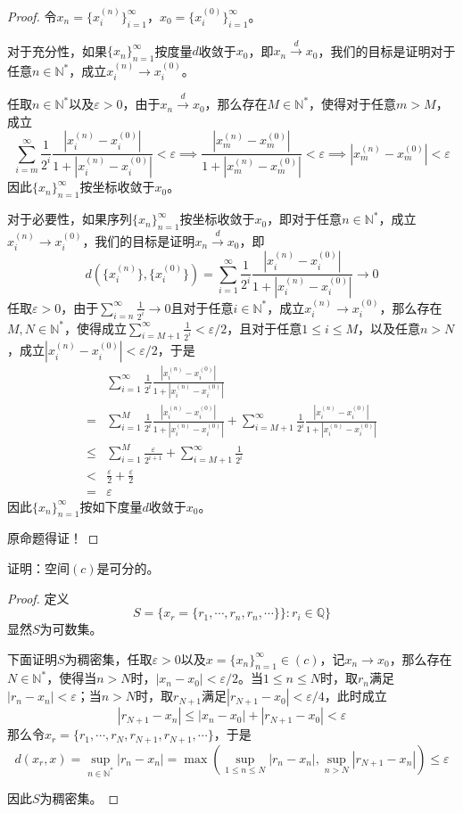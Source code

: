 \documentclass[lang = cn, scheme = chinese, 10pt]{elegantbook}
\newcommand{\N}{\mathbb{N}}  %
\newcommand{\Q}{\mathbb{Q}}  %
\begin{document}
\begin{proof}
	令$x_n=\{ x_i^{(n)} \}_{i=1}^{\infty}$，$x_0=\{ x_i^{(0)} \}_{i=1}^{\infty}$。
	
	对于充分性，如果$\{x_n\}_{n=1}^{\infty}$按度量$d$收敛于$x_0$，即$x_n\xrightarrow{d}x_0$，我们的目标是证明对于任意$n\in\N^*$，成立$x_i^{(n)}\to x_i^{(0)}$。
	
	任取$n\in\N^*$以及$\varepsilon>0$，由于$x_n\xrightarrow{d}x_0$，那么存在$M\in\N^*$，使得对于任意$m>M$，成立
	$$
	\sum_{i=m}^{\infty}\frac{1}{2^i}\frac{|x_i^{(n)}-x_i^{(0)}|}{1+|x_i^{(n)}-x_i^{(0)}|}<\varepsilon
	\implies 
	\frac{|x_m^{(n)}-x_m^{(0)}|}{1+|x_m^{(n)}-x_m^{(0)}|}<\varepsilon
	\implies
	|x_m^{(n)}-x_m^{(0)}|<\varepsilon
	$$
	因此$\{x_n\}_{n=1}^{\infty}$按坐标收敛于$x_0$。
	
	对于必要性，如果序列$\{x_n\}_{n=1}^{\infty}$按坐标收敛于$x_0$，即对于任意$n\in\N^*$，成立$x_i^{(n)}\to x_i^{(0)}$，我们的目标是证明$x_n\xrightarrow{d}x_0$，即
	$$
	d(\{x_i^{(n)}\},\{x_i^{(0)}\})=\sum_{i=1}^{\infty}\frac{1}{2^i}\frac{|x_i^{(n)}-x_i^{(0)}|}{1+|x_i^{(n)}-x_i^{(0)}|}\to0
	$$
	任取$\varepsilon>0$，由于$\displaystyle\sum_{i=n}^{\infty}\frac{1}{2^i}\to0$且对于任意$i\in\N^*$，成立$x_i^{(n)}\to x_i^{(0)}$，那么存在$M,N\in\N^*$，使得成立$\displaystyle\sum_{i=M+1}^{\infty}\frac{1}{2^i}<\varepsilon/2$，且对于任意$1\le i \le M$，以及任意$n>N$，成立$|x_i^{(n)}-x_i^{(0)}|<\varepsilon/2$，于是
	\nonumber\begin{align}
		&\sum_{i=1}^{\infty}\frac{1}{2^i}\frac{|x_i^{(n)}-x_i^{(0)}|}{1+|x_i^{(n)}-x_i^{(0)}|}\\
		= & \sum_{i=1}^{M}\frac{1}{2^i}\frac{|x_i^{(n)}-x_i^{(0)}|}{1+|x_i^{(n)}-x_i^{(0)}|}+
		\sum_{i=M+1}^{\infty}\frac{1}{2^i}\frac{|x_i^{(n)}-x_i^{(0)}|}{1+|x_i^{(n)}-x_i^{(0)}|}\\
		\le & \sum_{i=1}^{M}\frac{\varepsilon}{2^{i+1}}+\sum_{i=M+1}^{\infty}\frac{1}{2^i}\\
		< & \frac{\varepsilon}{2}+\frac{\varepsilon}{2}\\
		= & \varepsilon
	\end{align}
	因此$\{x_n\}_{n=1}^{\infty}$按如下度量$d$收敛于$x_0$。
	
	原命题得证！
\end{proof}

\begin{proposition}
	证明：空间$(c)$是可分的。
\end{proposition}

\begin{proof}
	定义
	$$
	S=\{ x_r=\{ r_1,\cdots,r_n,r_n,\cdots \} \}:r_i\in\Q \}
	$$
	显然$S$为可数集。
	
	下面证明$S$为稠密集，任取$\varepsilon>0$以及$x=\{x_n\}_{n=1}^{\infty}\in (c)$，记$x_n\to x_0$，那么存在$N\in\N^*$，使得当$n>N$时，$|x_n-x_0|<\varepsilon/2$。当$1\le n \le N$时，取$r_n$满足$|r_n-x_n|<\varepsilon$；当$n>N$时，取$r_{N+1}$满足$|r_{N+1}-x_0|<\varepsilon/4$，此时成立
	$$
	|r_{N+1}-x_n|\le|x_n-x_0|+|r_{N+1}-x_0|<\varepsilon
	$$
	那么令$x_r=\{ r_1,\cdots,r_N,r_{N+1},r_{N+1},\cdots \}$，于是
	$$
	d(x_r,x)=\sup_{n\in\N^*}|r_n-x_n|=\max( \sup_{1\le n \le N}|r_n-x_n|,\sup_{n>N}|r_{N+1}-x_n| )\le \varepsilon
	$$
	
	因此$S$为稠密集。
\end{proof}
\end{document}
